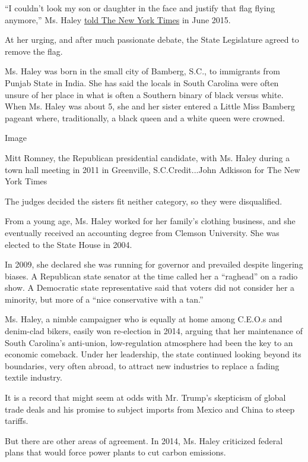 ``I couldn't look my son or daughter in the face and justify that flag
flying anymore,'' Ms. Haley
\href{https://www.nytimes.com/2015/06/24/us/politics/south-carolina-governor-nikki-r-haley-points-to-personal-reasons-not-politics-for-shift-on-confederate-flag.html}{told
The New York Times} in June 2015.

At her urging, and after much passionate debate, the State Legislature
agreed to remove the flag.

Ms. Haley was born in the small city of Bamberg, S.C., to immigrants
from Punjab State in India. She has said the locals in South Carolina
were often unsure of her place in what is often a Southern binary of
black versus white. When Ms. Haley was about 5, she and her sister
entered a Little Miss Bamberg pageant where, traditionally, a black
queen and a white queen were crowned.

Image

Mitt Romney, the Republican presidential candidate, with Ms. Haley
during a town hall meeting in 2011 in Greenville, S.C.Credit...John
Adkisson for The New York Times

The judges decided the sisters fit neither category, so they were
disqualified.

From a young age, Ms. Haley worked for her family's clothing business,
and she eventually received an accounting degree from Clemson
University. She was elected to the State House in 2004.

In 2009, she declared she was running for governor and prevailed despite
lingering biases. A Republican state senator at the time called her a
``raghead'' on a radio show. A Democratic state representative said that
voters did not consider her a minority, but more of a ``nice
conservative with a tan.''

Ms. Haley, a nimble campaigner who is equally at home among C.E.O.s and
denim-clad bikers, easily won re-election in 2014, arguing that her
maintenance of South Carolina's anti-union, low-regulation atmosphere
had been the key to an economic comeback. Under her leadership, the
state continued looking beyond its boundaries, very often abroad, to
attract new industries to replace a fading textile industry.

It is a record that might seem at odds with Mr. Trump's skepticism of
global trade deals and his promise to subject imports from Mexico and
China to steep tariffs.

But there are other areas of agreement. In 2014, Ms. Haley criticized
federal plans that would force power plants to cut carbon emissions.

